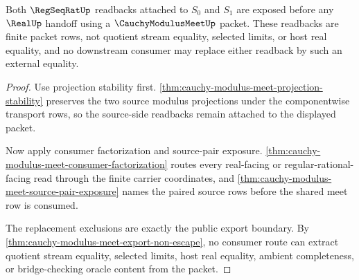 \begin{theorem}
\label{thm:cauchy-modulus-meet-paired-regseqrat-readback}
Both $\RegSeqRatUp$ readbacks attached to $S_0$ and $S_1$ are exposed before any $\RealUp$ handoff using a $\CauchyModulusMeetUp$ packet. These readbacks are finite packet rows, not quotient stream equality, selected limits, or host real equality, and no downstream consumer may replace either readback by such an external equality.
\end{theorem}
\begin{proof}
Use projection stability first. \autoref{thm:cauchy-modulus-meet-projection-stability} preserves the two source modulus projections under the componentwise transport rows, so the source-side readbacks remain attached to the displayed packet.

Now apply consumer factorization and source-pair exposure. \autoref{thm:cauchy-modulus-meet-consumer-factorization} routes every real-facing or regular-rational-facing read through the finite carrier coordinates, and \autoref{thm:cauchy-modulus-meet-source-pair-exposure} names the paired source rows before the shared meet row is consumed.

The replacement exclusions are exactly the public export boundary. By \autoref{thm:cauchy-modulus-meet-export-non-escape}, no consumer route can extract quotient stream equality, selected limits, host real equality, ambient completeness, or bridge-checking oracle content from the packet.
\end{proof}


